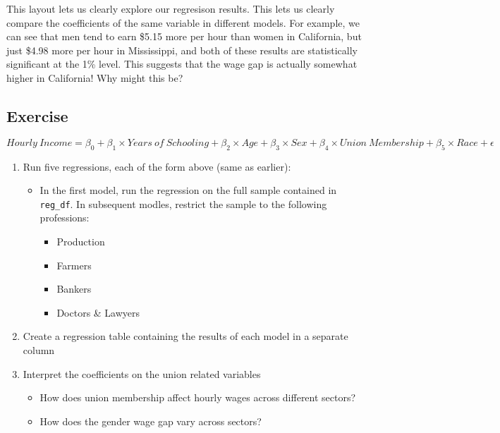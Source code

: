 \documentclass[
  letterpaper,
  DIV=11,
  numbers=noendperiod]{scrreprt}
\providecommand{\tightlist}{%
  \setlength{\itemsep}{0pt}\setlength{\parskip}{0pt}}\usepackage{longtable,booktabs,array}
\begin{document}
This layout lets us clearly explore our regresison results. This lets us
clearly compare the coefficients of the same variable in different
models. For example, we can see that men tend to earn \$5.15 more per
hour than women in California, but just \$4.98 more per hour in
Mississippi, and both of these results are statistically significant at
the 1\% level. This suggests that the wage gap is actually somewhat
higher in California! Why might this be?

\hypertarget{exercise-24}{%
\subsection{Exercise}\label{exercise-24}}

\[ Hourly\ Income= \beta_0 + \beta_1 \times Years\ of\ Schooling + \beta_2 \times Age + \beta_3 \times Sex + \beta_4 \times Union\ Membership + \beta_5 \times Race +\epsilon \]

\begin{enumerate}
\def\labelenumi{\arabic{enumi}.}
\tightlist
\item
  Run five regressions, each of the form above (same as earlier):

  \begin{itemize}
  \tightlist
  \item
    In the first model, run the regression on the full sample contained
    in \texttt{reg\_df}. In subsequent modles, restrict the sample to
    the following professions:

    \begin{itemize}
    \tightlist
    \item
      Production
    \item
      Farmers
    \item
      Bankers
    \item
      Doctors \& Lawyers
    \end{itemize}
  \end{itemize}
\item
  Create a regression table containing the results of each model in a
  separate column
\item
  Interpret the coefficients on the union related variables

  \begin{itemize}
  \tightlist
  \item
    How does union membership affect hourly wages across different
    sectors?
  \item
    How does the gender wage gap vary across sectors?
  \end{itemize}
\end{enumerate}
\end{document}

